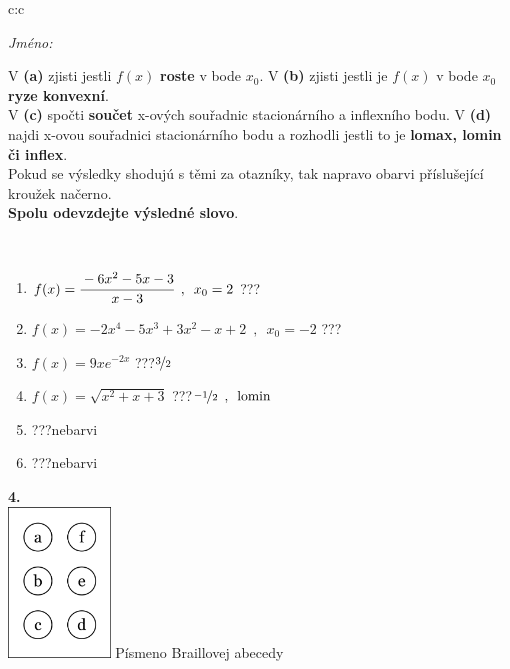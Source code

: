 \documentclass[10pt]{report}
\begin{document}
\begin{tabular}{c:c}
\begin{minipage}[c][104.5mm][t]{0.5\linewidth}
\begin{center}
\textit{Jméno:}\phantom{xxxxxxxxxxxxxxxxxxxxxxxxxxxxxxxxxxxxxxxxxxxxxxxxxxxxxxxxxxxxxxxxx}\\[5mm]
\begin{minipage}{0.95\linewidth}
\begin{center}
{\small V \textbf{(a)} zjisti jestli $f(x)$ \textbf{roste} v bode $x_0$. V \textbf{(b)} zjisti jestli je $f(x)$ v bode $x_0$ \textbf{ryze konvexní}.\\V \textbf{(c)} spočti \textbf{součet} x-ových souřadnic stacionárního a inflexního bodu. V \textbf{(d)} najdi x-ovou souřadnici stacionárního bodu a rozhodli jestli to je \textbf{lomax, lomin či inflex}.\\Pokud se výsledky shodujú s těmi za otazníky, tak napravo obarvi příslušející kroužek načerno.\\\textbf{Spolu odevzdejte výsledné slovo}}.
\end{center}
\end{minipage}
\\[1mm]
\begin{minipage}{0.79\linewidth}
\begin{center}
\begin{varwidth}{\linewidth}
\begin{enumerate}
\normalsize
\item $f(x)=\cfrac{-6x^2-5x-3}{x-3}\enspace , \enspace x_0=2$\quad \dotfill\; ???\;\dotfill \quad {}
\item $f(x)=-2x^4-5x^3+3x^2-x+2\enspace , \enspace x_0=-2$\quad \dotfill\; ???\;\dotfill \quad {}
\item $f(x)=9xe^{-2x}$\quad \dotfill\; ???\;\dotfill \quad $\nicefrac{3}{2}$
\item $f(x)=\sqrt{x^2+x+3}$\quad \dotfill\; ???\;\dotfill \quad $\nicefrac{-1}{2}\enspace , \enspace \mathrm{lomin}$
\item \quad \dotfill\; ???\;\dotfill \quad nebarvi
\item \quad \dotfill\; ???\;\dotfill \quad nebarvi
\end{enumerate}
\end{varwidth}
\end{center}
\end{minipage}
\begin{minipage}{0.20\linewidth}
\begin{center}
{\Huge\bfseries 4.} \\[2mm]
\includegraphics[height=40mm]{../images/braille.png}
{\small Písmeno Braillovej abecedy}
\end{center}
\end{minipage}
\end{center}
\end{minipage}
%
\end{tabular}
\end{document}
